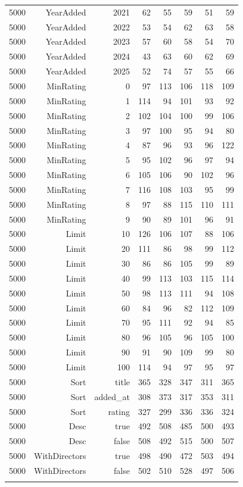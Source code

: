 \begin{longtable}{rrrrrrrr}
	5000 & YearAdded & 2021 & 62 & 55 & 59 & 51 & 59 \\
	5000 & YearAdded & 2022 & 53 & 54 & 62 & 63 & 58 \\
	5000 & YearAdded & 2023 & 57 & 60 & 58 & 54 & 70 \\
	5000 & YearAdded & 2024 & 43 & 63 & 60 & 62 & 69 \\
	5000 & YearAdded & 2025 & 52 & 74 & 57 & 55 & 66 \\
	5000 & MinRating & 0 & 97 & 113 & 106 & 118 & 109 \\
	5000 & MinRating & 1 & 114 & 94 & 101 & 93 & 92 \\
	5000 & MinRating & 2 & 102 & 104 & 100 & 99 & 106 \\
	5000 & MinRating & 3 & 97 & 100 & 95 & 94 & 80 \\
	5000 & MinRating & 4 & 87 & 96 & 93 & 96 & 122 \\
	5000 & MinRating & 5 & 95 & 102 & 96 & 97 & 94 \\
	5000 & MinRating & 6 & 105 & 106 & 90 & 102 & 96 \\
	5000 & MinRating & 7 & 116 & 108 & 103 & 95 & 99 \\
	5000 & MinRating & 8 & 97 & 88 & 115 & 110 & 111 \\
	5000 & MinRating & 9 & 90 & 89 & 101 & 96 & 91 \\
	5000 & Limit & 10 & 126 & 106 & 107 & 88 & 106 \\
	5000 & Limit & 20 & 111 & 86 & 98 & 99 & 112 \\
	5000 & Limit & 30 & 86 & 86 & 105 & 99 & 89 \\
	5000 & Limit & 40 & 99 & 113 & 103 & 115 & 114 \\
	5000 & Limit & 50 & 98 & 113 & 111 & 94 & 108 \\
	5000 & Limit & 60 & 84 & 96 & 82 & 112 & 109 \\
	5000 & Limit & 70 & 95 & 111 & 92 & 94 & 85 \\
	5000 & Limit & 80 & 96 & 105 & 96 & 105 & 100 \\
	5000 & Limit & 90 & 91 & 90 & 109 & 99 & 80 \\
	5000 & Limit & 100 & 114 & 94 & 97 & 95 & 97 \\
	5000 & Sort & title & 365 & 328 & 347 & 311 & 365 \\
	5000 & Sort & added\_at & 308 & 373 & 317 & 353 & 311 \\
	5000 & Sort & rating & 327 & 299 & 336 & 336 & 324 \\
	5000 & Desc & true & 492 & 508 & 485 & 500 & 493 \\
	5000 & Desc & false & 508 & 492 & 515 & 500 & 507 \\
	5000 & WithDirectors & true & 498 & 490 & 472 & 503 & 494 \\
	5000 & WithDirectors & false & 502 & 510 & 528 & 497 & 506 \\
\bottomrule
\label{tab:parameterverteilung}
\end{longtable}